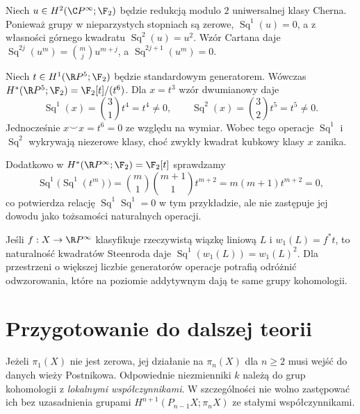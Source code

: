 \begin{przyklad}
Niech $u\in H^2(\C P^\infty;\F_2)$ będzie redukcją
modulo $2$ uniwersalnej klasy Cherna. Ponieważ
grupy w nieparzystych stopniach są zerowe,
$\operatorname{Sq}^1(u)=0$, a z własności górnego
kwadratu $\operatorname{Sq}^2(u)=u^2$.
Wzór Cartana daje
$\operatorname{Sq}^{2j}(u^m)=\binom mj u^{m+j}$,
a $\operatorname{Sq}^{2j+1}(u^m)=0$.
\end{przyklad}


\begin{przyklad}
\label{prz:steenrod-rp5-obliczenia-v7}
Niech $t\in H^1(\R P^5;\F_2)$ będzie standardowym
generatorem. Wówczas
$H^*(\R P^5;\F_2)=\F_2[t]/(t^6)$.
Dla $x=t^3$ wzór dwumianowy daje
\[
\operatorname{Sq}^1(x)=\binom31t^4=t^4\ne0,\qquad
\operatorname{Sq}^2(x)=\binom32t^5=t^5\ne0.
\]
Jednocześnie $x\smile x=t^6=0$ ze względu na wymiar.
Wobec tego operacje $\operatorname{Sq}^1$ i
$\operatorname{Sq}^2$ wykrywają niezerowe klasy,
choć zwykły kwadrat kubkowy klasy $x$ zanika.

Dodatkowo w $H^*(\R P^\infty;\F_2)=\F_2[t]$
sprawdzamy
\[
\operatorname{Sq}^1\bigl(\operatorname{Sq}^1(t^m)\bigr)
=\binom m1\binom{m+1}1t^{m+2}
=m(m+1)t^{m+2}=0,
\]
co potwierdza relację
$\operatorname{Sq}^1\operatorname{Sq}^1=0$
w tym przykładzie, ale nie zastępuje jej dowodu
jako tożsamości naturalnych operacji.
\end{przyklad}

\begin{przyklad}
Jeśli $f:X\to\R P^\infty$ klasyfikuje rzeczywistą
wiązkę liniową $L$ i $w_1(L)=f^*t$, to naturalność
kwadratów Steenroda daje
$\operatorname{Sq}^1(w_1(L))=w_1(L)^2$.
Dla przestrzeni o większej liczbie generatorów
operacje potrafią odróżnić odwzorowania, które na poziomie
addytywnym dają te same grupy kohomologii.
\end{przyklad}

\section{Przygotowanie do dalszej teorii}
\begin{uwaga}
Jeżeli $\pi_1(X)$ nie jest zerowa, jej działanie
na $\pi_n(X)$ dla $n\ge2$ musi wejść do danych
wieży Postnikowa. Odpowiednie niezmienniki $k$
należą do grup kohomologii z \emph{lokalnymi
współczynnikami}. W szczególności nie wolno
zastępować ich bez uzasadnienia grupami
$H^{n+1}(P_{n-1}X;\pi_nX)$ ze stałymi współczynnikami.
\end{uwaga}

